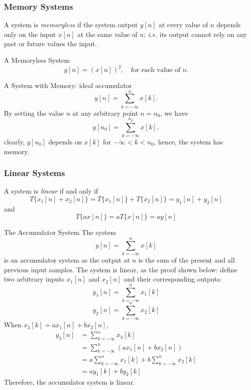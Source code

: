 \subsubsection{Memory Systems}
A system is \textit{memoryless} if the system output $y[n]$ at every value of $n$ depends only on the input $x[n]$ at the same value of $n$; \textit{i.e.} its output cannot rely on any past or future values the input.
\begin{ex}{A Memoryless System}
    \[
        y[n] = (x[n])^2, \quad \text{for each value of $n$.}
    \]
\end{ex}

\begin{ex}{A System with Memory: ideal accumulator}
    \[
        y[n] = \sum_{k=-\infty}^n x[k].
    \]
    By setting the value $n$ at any arbitrary point $n=n_0$, we have
    \[
        y[n_0] = \sum_{k=-\infty}^{n_0} x[k],
    \]
    clearly, $y[n_0]$ depends on $x[k]$ for $-\infty < k < n_0$, hence, the system has memory.
\end{ex}
\subsubsection{Linear Systems}
A system is \textit{linear} if and only if
\[
    T\{ x_{1}[n] + x_{2}[n] \} 
    =  T\{ x_{1}[n] \} + T\{ x_{2}[n] \}
    = y_{1}[n] + y_{2}[n]
\]
and
\[
     T\{ ax[n] \} = a T\{ x[n] \} = ay[n]
\]

\begin{ex}{The Accumulator System}
The system
    \[
        y[n] = \sum_{k=-\infty}^{n}x[k]
    \]
is an accumulator system as the output at $n$ is the sum of the present and all previous input samples. The system is linear, as the proof shown below: define two arbitrary inputs $x_{1}[n]$ and $x_{2}[n]$ and their corresponding outputs:
\[
    y_{1}[n] = \sum_{k=-\infty}^{n}x_{1}[k]
\]
\[
    y_{2}[n] = \sum_{k=-\infty}^{n}x_{2}[k]
\]
When $x_{3}[k] = ax_{1}[n] + bx_{2}[n]$, 
\begin{align*}
    y_{3}[n]
    & = \sum_{k=-\infty}^{n}x_{3}[k] \\
    & = \sum_{k=-\infty}^{n} (ax_{1}[n] + bx_{2}[n]) \\
    & = a \sum_{k=-\infty}^{n} x_{1}[k] + b \sum_{k=-\infty}^{n} x_{2}[k] \\
    & = ay_{1}[k] + by_{2}[k]
\end{align*}
Therefore, the accumulator system is linear.
\end{ex}

